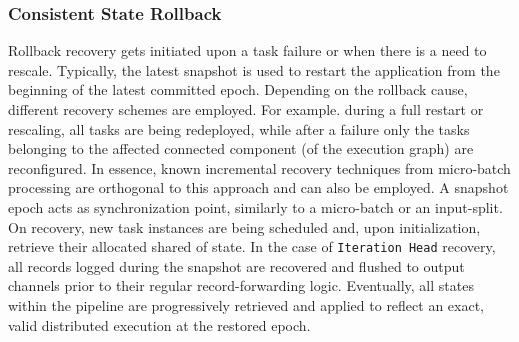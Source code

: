 
\subsubsection{Consistent State Rollback}

Rollback recovery gets initiated upon a task failure or when there is a need to rescale. Typically, the latest snapshot is used to restart the application from the beginning of the latest committed epoch. Depending on the rollback cause, different recovery schemes are employed. For example. during a full restart or rescaling, all tasks are being redeployed, while after a failure only the tasks belonging to the affected connected component (of the execution graph) are reconfigured. In essence, known incremental recovery techniques from  micro-batch processing \cite{zaharia2012discretized} are orthogonal to this approach and can also be employed. A snapshot epoch acts as synchronization point, similarly to a micro-batch or an input-split. On recovery, new task instances are being scheduled and, upon initialization, retrieve their allocated shared of state. In the case of  \texttt{Iteration Head} recovery, all records logged during the snapshot are recovered and flushed to output channels prior to their regular record-forwarding logic. Eventually, all states within the pipeline are progressively retrieved and applied to reflect an exact, valid distributed execution at the restored epoch. 

